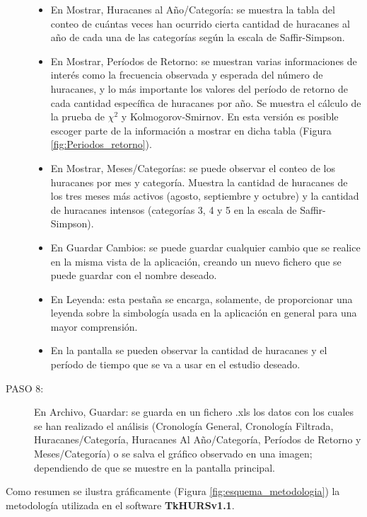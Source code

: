 \begin{description}
\begin{itemize}
\item En Mostrar, Huracanes al Año/Categoría: se muestra la tabla del conteo de cuántas veces han ocurrido cierta cantidad de huracanes al año de cada una de las categorías según la escala de Saffir-Simpson.

\item En Mostrar, Períodos de Retorno: se muestran varias informaciones de interés como la frecuencia observada y esperada del número de huracanes, y lo más importante los valores del período de retorno de cada cantidad específica de huracanes por año. Se muestra el cálculo de la prueba de $\chi^{2}$ y Kolmogorov-Smirnov. En esta versión es posible escoger parte de la información a mostrar en dicha tabla (Figura \ref{fig:Periodos_retorno}).

\item En Mostrar, Meses/Categorías: se puede observar el conteo de los huracanes por mes y categoría. Muestra la cantidad de huracanes de los tres meses más activos (agosto, septiembre y octubre) y la cantidad de huracanes intensos (categorías 3, 4 y 5 en la escala de Saffir-Simpson).

\item En Guardar Cambios: se puede guardar cualquier cambio que se realice en la misma vista de la aplicación, creando un nuevo fichero que se puede guardar con el nombre deseado.

\item En Leyenda: esta pestaña se encarga, solamente, de proporcionar una leyenda sobre la simbología usada en la aplicación en general para una mayor comprensión.

\item En la pantalla se pueden observar la cantidad de huracanes y el período de tiempo que se va a usar en el estudio deseado.

\end{itemize}

\item[PASO 8:]{ En Archivo, Guardar: se guarda en un fichero .xls los datos con los cuales se han realizado el análisis (Cronología General, Cronología Filtrada, Huracanes/Categoría, Huracanes Al Año/Categoría, Períodos de Retorno y Meses/Categoría) o se salva el gráfico observado en una imagen; dependiendo de que se muestre en la pantalla principal.}


\end{description}


Como resumen se ilustra gráficamente (Figura \ref{fig:esquema_metodologia}) la metodología utilizada en el software \textbf{TkHURSv1.1}.

